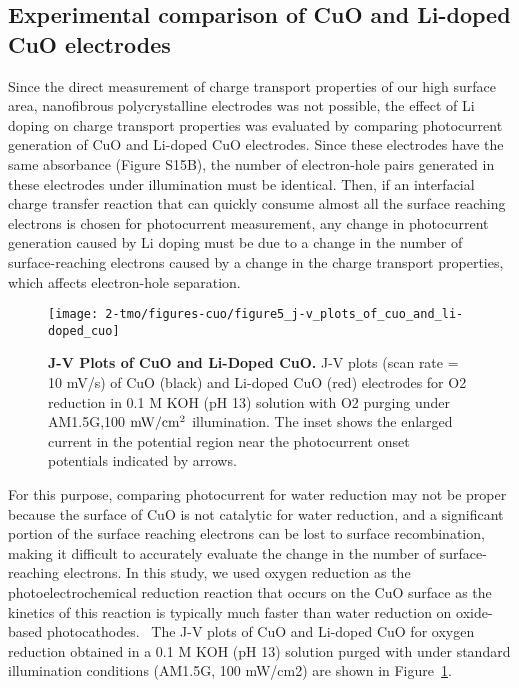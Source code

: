 \subsection{Experimental comparison of CuO and Li-doped CuO electrodes}
Since the direct measurement of charge transport properties of our high surface area, nanofibrous polycrystalline electrodes was not possible, the effect of Li doping on charge transport properties was evaluated by comparing photocurrent generation of CuO and Li-doped CuO electrodes.  Since these electrodes have the same absorbance (Figure S15B), the number of electron-hole pairs generated in these electrodes under illumination must be identical.  Then, if an interfacial charge transfer reaction that can quickly consume almost all the surface reaching electrons is chosen for photocurrent measurement, any change in photocurrent generation caused by Li doping must be due to a change in the number of surface-reaching electrons caused by a change in the charge transport properties, which affects electron-hole separation.

\begin{figure}
    \centering
    \texttt{[image: 2-tmo/figures-cuo/figure5\_j-v\_plots\_of\_cuo\_and\_li-doped\_cuo]}
    \caption{
    \textbf{J-V Plots of CuO and Li-Doped CuO.}
    J-V plots (scan rate = 10 mV/s) of CuO (black) and Li-doped CuO (red) electrodes for O2 reduction in 0.1 M KOH (pH 13) solution with O2 purging under AM1.5G,100 ${\rm mW/cm^2}$ illumination. The inset shows the enlarged current in the potential region near the photocurrent onset potentials indicated by arrows.
    }
    \label{cuo:fig:exp}
\end{figure}

For this purpose, comparing photocurrent for water reduction may not be proper because the surface of CuO is not catalytic for water reduction, and a significant portion of the surface reaching electrons can be lost to surface recombination, making it difficult to accurately evaluate the change in the number of surface-reaching electrons. In this study, we used oxygen reduction as the photoelectrochemical reduction reaction that occurs on the CuO surface as the kinetics of this reaction is typically much faster than water reduction on oxide-based photocathodes.~\cite{cardiel2017electrochemical,kang2016photoelectrochemical,read2012electrochemical,wheeler2017photoelectrochemical} The J-V plots of CuO and Li-doped CuO for oxygen reduction obtained in a 0.1 M KOH (pH 13) solution purged with  under standard illumination conditions (AM1.5G, 100 mW/cm2) are shown in Figure~\ref{cuo:fig:exp}.

